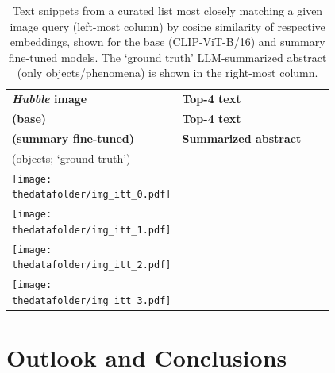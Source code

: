 \documentclass[10pt]{article} %
\newcommand{\hubble}{\emph{Hubble}\xspace}
\begin{document}
\begin{table}[h!]
  \centering
  \renewcommand{\arraystretch}{0.1}
  \begin{tabular}{m{3cm} m{3.6cm} m{3.6cm} m{4cm}}
      \toprule
      \centering \bfseries \hubble image & \centering \textbf{Top-4 text} \\ \small\textbf{\textcolor{deeppurple}{(base)}} & \centering  \textbf{Top-4 text} \\ \small\textbf{\textcolor{deepred}{(summary fine-tuned)}} & \centering \textbf{Summarized abstract} \\ (objects; `ground truth') \tabularnewline
      \midrule
      \centering \texttt{[image: \\thedatafolder/img\_itt\_0.pdf]} & \centering \scriptsize  & \centering  \scriptsize  &  {\scriptsize } \tabularnewline
      \midrule
      \centering \texttt{[image: \\thedatafolder/img\_itt\_1.pdf]} & \centering \scriptsize  & \centering  \scriptsize  &  {\scriptsize } \tabularnewline
      \midrule
      \centering \texttt{[image: \\thedatafolder/img\_itt\_2.pdf]} & \centering \scriptsize  & \centering  \scriptsize  &  {\scriptsize } \tabularnewline
      \midrule
      \centering \texttt{[image: \\thedatafolder/img\_itt\_3.pdf]} & \centering \scriptsize  & \centering  \scriptsize  &  {\scriptsize } \tabularnewline
      \bottomrule
  \end{tabular}
  \caption{Text snippets from a curated list most closely matching a given image query (left-most column) by cosine similarity of respective embeddings, shown for the \textcolor{deeppurple}{base} (CLIP-ViT-B/16) and \textcolor{deepred}{summary fine-tuned} models. The `ground truth' LLM-summarized abstract (only objects/phenomena) is shown in the right-most column.}
  \label{tab:itt}
\end{table}

\section{Outlook and Conclusions}
\label{sec:conclusion}
\end{document}
